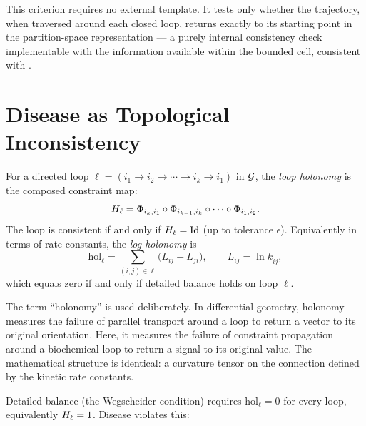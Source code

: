 This criterion requires no external template.  It tests only whether the
trajectory, when traversed around each closed loop, returns exactly to its
starting point in the partition-space representation --- a purely internal
consistency check implementable with the information available within the
bounded cell, consistent with .


\section{Disease as Topological Inconsistency}
\label{sec:topo-inconsistency}

\begin{definition}
\label{def:holonomy}
For a directed loop $\ell = (i_1 \to i_2 \to \cdots \to i_k \to i_1)$
in $\mathcal{G}$, the \emph{loop holonomy} is the composed constraint map:
\begin{equation}
  H_\ell
  = \Phi_{i_k, i_1} \circ \Phi_{i_{k-1}, i_k} \circ \cdots \circ \Phi_{i_1, i_2}.
  \label{eq:holonomy}
\end{equation}
The loop is consistent if and only if $H_\ell = \mathrm{Id}$ (up to
tolerance $\epsilon$).  Equivalently in terms of rate constants, the
\emph{log-holonomy} is
\begin{equation}
  \mathrm{hol}_\ell
  = \sum_{(i,j)\in\ell} \bigl(L_{ij} - L_{ji}\bigr),
  \qquad
  L_{ij} = \ln k_{ij}^{+},
  \label{eq:log-holonomy}
\end{equation}
which equals zero if and only if detailed balance holds on loop $\ell$.
\end{definition}

\begin{remark}
The term ``holonomy'' is used deliberately.  In differential geometry,
holonomy measures the failure of parallel transport around a loop to
return a vector to its original orientation.  Here, it measures the
failure of constraint propagation around a biochemical loop to return a
signal to its original value.  The mathematical structure is identical:
a curvature tensor on the connection defined by the kinetic rate constants.
\end{remark}

Detailed balance (the Wegscheider condition) requires $\mathrm{hol}_\ell = 0$
for every loop, equivalently $H_\ell = 1$.  Disease violates this:

